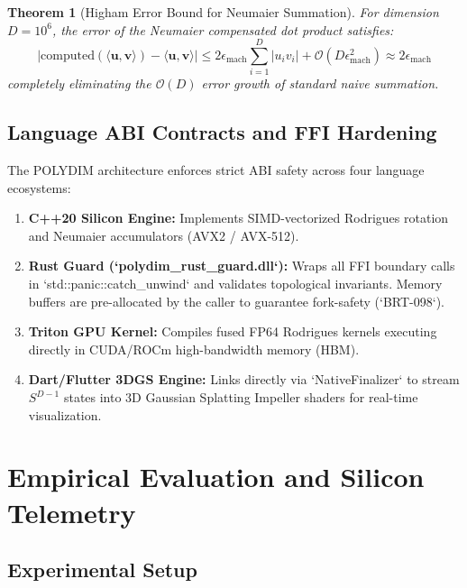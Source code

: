 \documentclass[11pt,twoside,a4paper]{article}
\theoremstyle{plain}
\newtheorem{theorem}{Theorem}[section]
\theoremstyle{definition}
\theoremstyle{remark}
\begin{document}
\begin{theorem}[Higham Error Bound for Neumaier Summation]
For dimension $D = 10^6$, the error of the Neumaier compensated dot product satisfies:
\begin{equation}
| \text{computed}(\langle \mathbf{u}, \mathbf{v} \rangle) - \langle \mathbf{u}, \mathbf{v} \rangle | \le 2 \epsilon_{\text{mach}} \sum_{i=1}^D |u_i v_i| + \mathcal{O}(D \epsilon_{\text{mach}}^2) \approx 2 \epsilon_{\text{mach}}
\end{equation}
completely eliminating the $\mathcal{O}(D)$ error growth of standard naive summation.
\end{theorem}

\subsection{Language ABI Contracts and FFI Hardening}

The POLYDIM architecture enforces strict ABI safety across four language ecosystems:
\begin{enumerate}
    \item \textbf{C++20 Silicon Engine:} Implements SIMD-vectorized Rodrigues rotation and Neumaier accumulators (AVX2 / AVX-512).
    \item \textbf{Rust Guard (`polydim_rust_guard.dll`):} Wraps all FFI boundary calls in `std::panic::catch_unwind` and validates topological invariants. Memory buffers are pre-allocated by the caller to guarantee fork-safety (`BRT-098`).
    \item \textbf{Triton GPU Kernel:} Compiles fused FP64 Rodrigues kernels executing directly in CUDA/ROCm high-bandwidth memory (HBM).
    \item \textbf{Dart/Flutter 3DGS Engine:} Links directly via `NativeFinalizer` to stream $S^{D-1}$ states into 3D Gaussian Splatting Impeller shaders for real-time visualization.
\end{enumerate}

\section{Empirical Evaluation and Silicon Telemetry}
\label{sec:empirical_eval}

\subsection{Experimental Setup}
\end{document}
